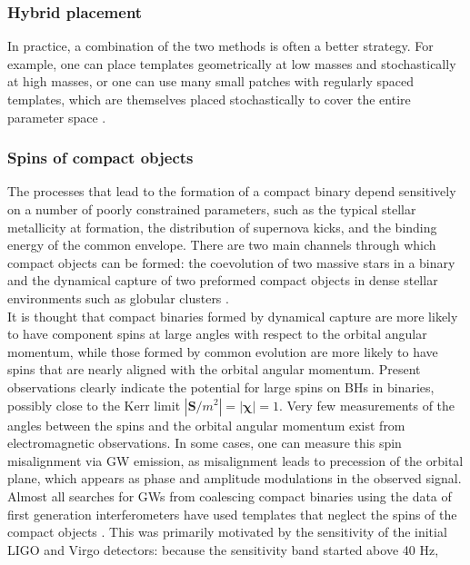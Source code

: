 \documentclass[binding=0.6cm, LaM]{sapthesis}
\begin{document}
\subsubsection{Hybrid placement}

	In practice, a combination of the two methods is often a better strategy. 
	For example, one can place templates geometrically at low masses 
	and stochastically at high masses, or one can use many small patches 
	with regularly spaced templates, which are themselves placed stochastically 
	to cover the entire parameter space \cite{29, 34}. 

\subsubsection{Spins of compact objects}

	The processes that lead to the formation of a compact binary
	depend sensitively on a number of poorly constrained parameters, 
	such as the typical stellar metallicity at formation, 
	the distribution of supernova kicks, 
	and the binding energy of the common envelope. 
	There are two main channels through which compact objects can be formed:
	the coevolution of two massive stars in a binary and 
	the dynamical capture of two preformed compact objects 
	in dense stellar environments such as globular clusters \cite{37}. \\	
	It is thought that compact binaries formed by dynamical capture 
	are more likely to have component spins
	at large angles with respect to the orbital angular momentum, 
	while those formed by common evolution are more likely to have 
	spins that are nearly aligned with the orbital angular momentum.
	Present observations clearly indicate the potential for large spins 
	on BHs in binaries, possibly close to the Kerr limit $|\mathbf{S}/m^2| = |\mathbf{\chi}| = 1$.
	Very few measurements of the angles between the spins and 
	the orbital angular momentum exist from electromagnetic observations. 
	In some cases, one can measure this spin misalignment via GW emission, 
	as misalignment leads to precession of the orbital plane, 
	which appears as phase and amplitude modulations in the observed signal. \\
	Almost all searches for GWs from coalescing compact binaries 
	using the data of first generation interferometers 
	have used templates that neglect the spins of the compact objects \cite{32}.
	This was primarily motivated by the sensitivity of the initial LIGO and Virgo detectors:
	because the sensitivity band started above 40 Hz, 
\end{document}
